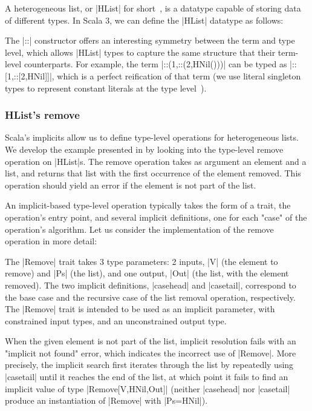 A heterogeneous list, or |HList| for short~\citep{kiselyov2004strongly}, is a datatype capable of storing data of different types.
In Scala 3, we can define the |HList| datatype as follows:

\hlistEnumDefinition

\noindent
The |::| constructor offers an interesting symmetry between the term and type level, which allows |HList| types to capture the same structure that their term-level counterparts.
For example, the term |::(1,::(2,HNil()))| can be typed as |::[1,::[2,HNil]]|, which is a perfect reification of that term (we use literal singleton types to represent constant literals at the type level~\citep{leontiev2014sip}).

\subsubsection{HList's remove}
\label{sec:hlists-remove}

Scala's implicits allow us to define type-level operations for heterogeneous lists.
We develop the example presented in  by looking into the type-level remove operation on |HList|s.
The remove operation takes as argument an element and a list, and returns that list with the first occurrence of the element removed.
This operation should yield an error if the element is not part of the list.

An implicit-based type-level operation typically takes the form of a trait, the operation's entry point, and several implicit definitions, one for each "case" of the operation's algorithm.
Let us consider the implementation of the remove operation in more detail:

\memImplicitRemove

\noindent
The |Remove| trait takes 3 type parameters: 2 inputs, |V| (the element to remove) and |Ps| (the list), and one output, |Out| (the list, with the element removed).
The two implicit definitions, |casehead| and |casetail|, correspond to the base case and the recursive case of the list removal operation, respectively.
The |Remove| trait is intended to be used as an implicit parameter, with constrained input types, and an unconstrained output type.

When the given element is not part of the list, implicit resolution fails with an "implicit not found" error, which indicates the incorrect use of |Remove|.
More precisely, the implicit search first iterates through the list by repeatedly using |casetail| until it reaches the end of the list, at which point it fails to find an implicit value of type |Remove[V,HNil,Out]| (neither |casehead| nor |casetail| produce an instantiation of |Remove| with |Ps=HNil|).


